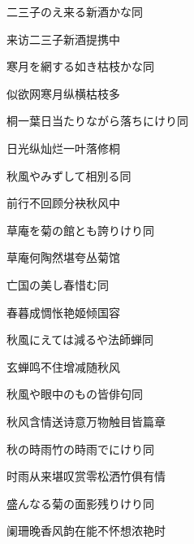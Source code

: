 \begin{haiku}
    {\FH 二三子のえ来る新酒かな}\hfill{\FH 同}

    {\FK 来访二三子新酒提携中}
\end{haiku}

\begin{haiku}
    {\FH 寒月を網する如き枯枝かな}\hfill{\FH 同}

    {\FK 似欲网寒月纵横枯枝多}
\end{haiku}

\begin{haiku}
    {\FH 桐一葉日当たりながら落ちにけり}\hfill{\FH 同}

    {\FK 日光纵灿烂一叶落修桐}
\end{haiku}

\begin{haiku}
    {\FH 秋風やみずして相別る}\hfill{\FH 同}

    {\FK 前行不回顾分袂秋风中}
\end{haiku}

\begin{haiku}
    {\FH 草庵を菊の館とも誇りけり}\hfill{\FH 同}

    {\FK 草庵何陶然堪夸丛菊馆}
\end{haiku}

\begin{haiku}
    {\FH 亡国の美し春惜む}\hfill{\FH 同}

    {\FK 春暮成惆怅艳姬倾国容}
\end{haiku}

\begin{haiku}
    {\FH 秋風にえては減るや法師蝉}\hfill{\FH 同}

    {\FK 玄蝉鸣不住增减随秋风}
\end{haiku}

\begin{haiku}
    {\FH 秋風や眼中のもの皆俳句}\hfill{\FH 同}

    {\FK 秋风含情送诗意万物触目皆篇章}
\end{haiku}

\begin{haiku}
    {\FH 秋の時雨竹の時雨でにけり}\hfill{\FH 同}

    {\FK 时雨从来堪叹赏零松洒竹俱有情}
\end{haiku}

\begin{haiku}
    {\FH 盛んなる菊の面影残りけり}\hfill{\FH 同}

    {\FK 阑珊晚香风韵在能不怀想浓艳时}
\end{haiku}

